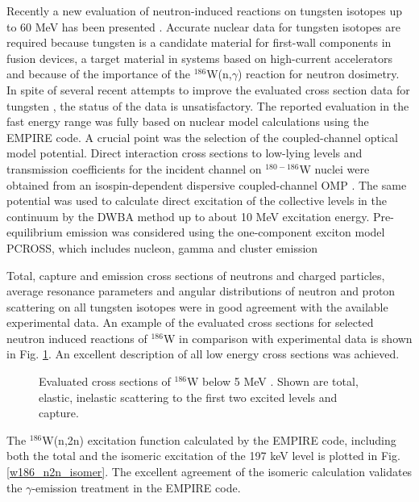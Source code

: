 Recently a new evaluation of neutron-induced reactions on tungsten
isotopes up to 60 MeV has been presented \cite{catrko07}. Accurate nuclear
data for tungsten isotopes are required because tungsten is a candidate
material for first-wall components in fusion devices, a target material in
systems based on high-current accelerators and because of the
importance of the $^{186}$W(n,$\gamma$) reaction for neutron
dosimetry. In spite of several recent attempts to
improve the evaluated cross section data for tungsten \cite{pe06}, the
status of the data is unsatisfactory. The reported evaluation in the fast
energy range \cite{catrko07} was fully based on nuclear model calculations
using the EMPIRE code. A crucial point was the selection of the
coupled-channel optical model potential. Direct interaction cross sections
to low-lying levels and transmission coefficients for the incident channel
on $^{180-186}$W nuclei were obtained from an isospin-dependent dispersive
coupled-channel OMP \cite{casoqu06,casitr06}. The same potential was used to
calculate direct excitation of the collective levels in the continuum
by the
DWBA method up to about 10 MeV excitation energy. Pre-equilibrium emission
was considered using the one-component exciton model PCROSS, which includes
nucleon, gamma and cluster emission

Total, capture and emission cross sections of neutrons and charged particles,
average resonance parameters and angular distributions of neutron and proton
scattering on all tungsten isotopes were in good agreement with the
available experimental data. An example of the evaluated cross sections for
selected neutron induced reactions of $^{186}$W in comparison with
experimental data is shown in Fig. \ref{w186_XS}. An excellent description
of all low energy cross sections was achieved.

\begin{figure}[tbph]
\caption{Evaluated cross sections of $^{186}$W below 5 MeV \protect\cite%
{catrko07}. Shown are total, elastic, inelastic scattering to the
first two excited levels and capture.}
\label{w186_XS}
\end{figure}

The $^{186}$W(n,2n) excitation function calculated by the EMPIRE code,
including both the total and the isomeric excitation of the 197 keV level is
plotted in Fig.\ref{w186_n2n_isomer}. The excellent agreement of the
isomeric calculation validates the $\gamma$-emission treatment in the EMPIRE
code.

